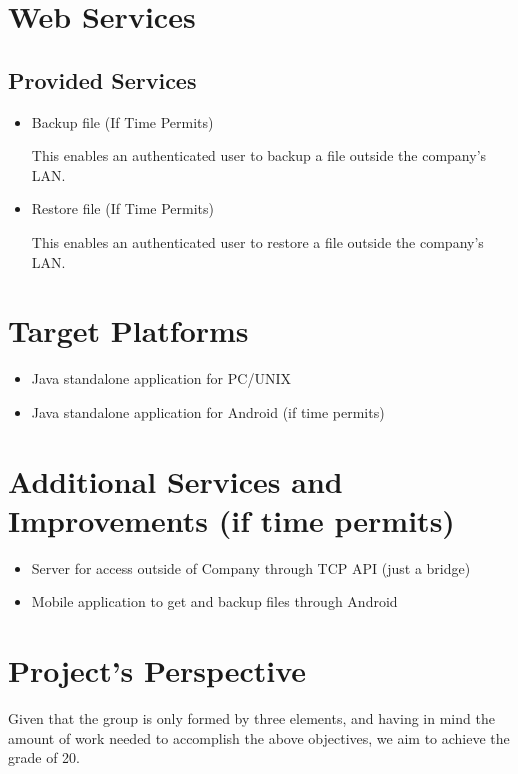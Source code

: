 \documentclass[a4paper]{article}
\begin{document}
\section{Web Services}
\subsection{Provided Services}
\begin{itemize}
\item Backup file (If Time Permits)

This enables an authenticated user to backup a file outside the company's LAN. 

\item Restore file (If Time Permits)

This enables an authenticated user to restore a file outside the company's LAN.

\end{itemize}

\section{Target Platforms}
\begin{itemize}
\item Java standalone application for PC/UNIX
\item Java standalone application for Android (if time permits)
\end{itemize}
 
\section{Additional Services and Improvements (if time permits)}
\begin{itemize}
\item Server for access outside of Company through TCP API (just a bridge)
\item Mobile application to get and backup files through Android
\end{itemize}

\section{Project's Perspective}
Given that the group is only formed by three elements, and having in mind the amount of work needed to accomplish the above objectives, we aim to achieve the grade of 20.
\end{document}
